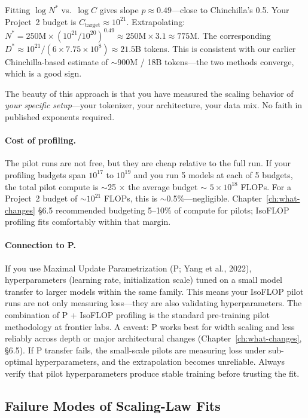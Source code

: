 Fitting $\log N^*$ vs.\ $\log C$ gives slope $p \approx 0.49$---close to Chinchilla's 0.5. Your Project~2 budget is $C_{\text{target}} \approx 10^{21}$. Extrapolating: $N^* = 250\text{M} \times (10^{21}/10^{20})^{0.49} \approx 250\text{M} \times 3.1 \approx 775$M. The corresponding $D^* \approx 10^{21} / (6 \times 7.75 \times 10^8) \approx 21.5$B tokens. This is consistent with our earlier Chinchilla-based estimate of $\sim$900M / 18B tokens---the two methods converge, which is a good sign.

The beauty of this approach is that you have measured the scaling behavior of \emph{your specific setup}---your tokenizer, your architecture, your data mix. No faith in published exponents required.

\paragraph{Cost of profiling.} The pilot runs are not free, but they are cheap relative to the full run. If your profiling budgets span $10^{17}$ to $10^{19}$ and you run 5 models at each of 5 budgets, the total pilot compute is $\sim$25 $\times$ the average budget $\sim$ $5 \times 10^{18}$ FLOPs. For a Project~2 budget of $\sim$$10^{21}$ FLOPs, this is $\sim$0.5\%---negligible. Chapter~\ref{ch:what-changes} \S6.5 recommended budgeting 5--10\% of compute for pilots; IsoFLOP profiling fits comfortably within that margin.

\paragraph{Connection to \textmu P.} If you use Maximal Update Parametrization (\textmu P; Yang et al., 2022), hyperparameters (learning rate, initialization scale) tuned on a small model transfer to larger models within the same family. This means your IsoFLOP pilot runs are not only measuring loss---they are also validating hyperparameters. The combination of \textmu P + IsoFLOP profiling is the standard pre-training pilot methodology at frontier labs. A caveat: \textmu P works best for width scaling and less reliably across depth or major architectural changes (Chapter~\ref{ch:what-changes}, \S6.5). If \textmu P transfer fails, the small-scale pilots are measuring loss under sub-optimal hyperparameters, and the extrapolation becomes unreliable. Always verify that pilot hyperparameters produce stable training before trusting the fit.


\subsection{Failure Modes of Scaling-Law Fits}
\label{sec:fitting-failures}

